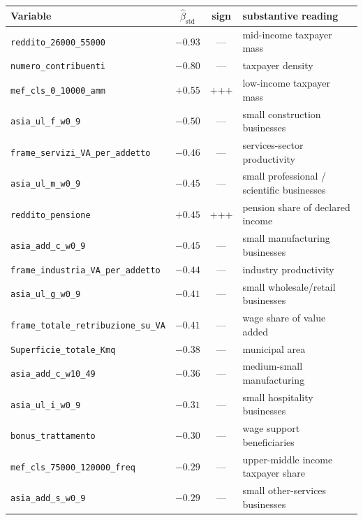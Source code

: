 \documentclass[11pt,a4paper]{article}
\begin{document}
\begin{table}[h!]
  \centering
  \small
  \begin{tabular}{lcc l}
    \toprule
    Variable & $\hat\beta_{\text{std}}$ & sign & substantive reading \\
    \midrule
    \texttt{reddito\_26000\_55000}                  & $-0.93$ & --- & mid-income taxpayer mass\\
    \texttt{numero\_contribuenti}                   & $-0.80$ & --- & taxpayer density\\
    \texttt{mef\_cls\_0\_10000\_amm}                & $+0.55$ & +++ & low-income taxpayer mass\\
    \texttt{asia\_ul\_f\_w0\_9}                     & $-0.50$ & --- & small construction businesses\\
    \texttt{frame\_servizi\_VA\_per\_addetto}       & $-0.46$ & --- & services-sector productivity\\
    \texttt{asia\_ul\_m\_w0\_9}                     & $-0.45$ & --- & small professional / scientific businesses\\
    \texttt{reddito\_pensione}                      & $+0.45$ & +++ & pension share of declared income\\
    \texttt{asia\_add\_c\_w0\_9}                    & $-0.45$ & --- & small manufacturing businesses\\
    \texttt{frame\_industria\_VA\_per\_addetto}     & $-0.44$ & --- & industry productivity\\
    \texttt{asia\_ul\_g\_w0\_9}                     & $-0.41$ & --- & small wholesale/retail businesses\\
    \texttt{frame\_totale\_retribuzione\_su\_VA}    & $-0.41$ & --- & wage share of value added\\
    \texttt{Superficie\_totale\_Kmq}                & $-0.38$ & --- & municipal area\\
    \texttt{asia\_add\_c\_w10\_49}                  & $-0.36$ & --- & medium-small manufacturing\\
    \texttt{asia\_ul\_i\_w0\_9}                     & $-0.31$ & --- & small hospitality businesses\\
    \texttt{bonus\_trattamento}                     & $-0.30$ & --- & wage support beneficiaries\\
    \texttt{mef\_cls\_75000\_120000\_freq}          & $-0.29$ & --- & upper-middle income taxpayer share\\
    \texttt{asia\_add\_s\_w0\_9}                    & $-0.29$ & --- & small other-services businesses\\

\end{tabular}
\end{table}
\end{document}
